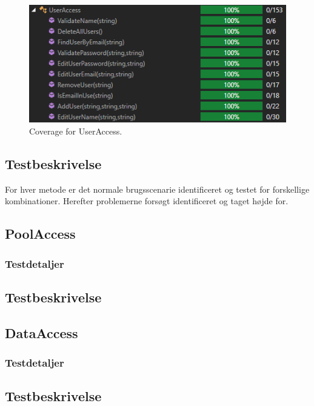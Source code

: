 \begin{figure}[H]
\centering
\includegraphics[width=0.7\linewidth]{figs/test/useraccesscoverage}
\caption{Coverage for UserAccess.}
\label{fig:useraccesscoverage}
\end{figure}

\subsection{Testbeskrivelse}
For hver metode er det normale brugsscenarie identificeret og testet for forskellige kombinationer. Herefter problemerne forsøgt identificeret og taget højde for.
 

\subsection{PoolAccess}

\subsubsection{Testdetaljer}



\subsection{Testbeskrivelse}

\subsection{DataAccess}

\subsubsection{Testdetaljer}



\subsection{Testbeskrivelse}

